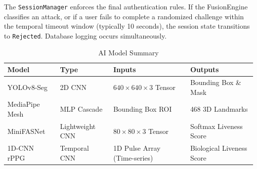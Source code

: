 \vspace{1em}
The \texttt{SessionManager} enforces the final authentication rules. If the FusionEngine classifies an attack, or if a user fails to complete a randomized challenge within the temporal timeout window (typically 10 seconds), the session state transitions to \texttt{Rejected}. Database logging occurs simultaneously.

\begin{table}[H]
\centering
\caption{AI Model Summary}
\begin{tabularx}{\textwidth}{|l|l|X|X|}
\hline
\textbf{Model} & \textbf{Type} & \textbf{Inputs} & \textbf{Outputs} \\
\hline
YOLOv8-Seg & 2D CNN & $640\times640\times3$ Tensor & Bounding Box \& Mask \\
MediaPipe Mesh & MLP Cascade & Bounding Box ROI & 468 3D Landmarks \\
MiniFASNet & Lightweight CNN & $80\times80\times3$ Tensor & Softmax Liveness Score \\
1D-CNN rPPG & Temporal CNN & 1D Pulse Array (Time-series) & Biological Liveness Score \\
\hline
\end{tabularx}
\end{table}